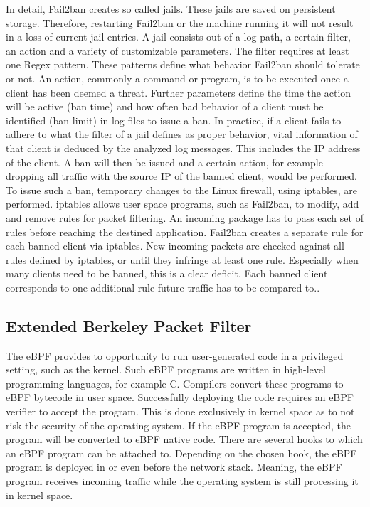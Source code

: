 In detail, Fail2ban creates so called jails.
These jails are saved on persistent storage.
Therefore, restarting Fail2ban or the machine running it will not result in a loss of current jail entries.
A jail consists out of a log path, a certain filter, an action and a variety of customizable parameters.
The filter requires at least one \ac{Regex} pattern.
These patterns define what behavior Fail2ban should tolerate or not.
An action, commonly a command or program, is to be executed once a client has been deemed a threat.
Further parameters define the time the action will be active (ban time) and how often bad behavior of a client must be identified (ban limit) in log files to issue a ban.
In practice, if a client fails to adhere to what the filter of a jail defines as proper behavior, vital information of that client is deduced by the analyzed log messages.
This includes the \ac{IP} address of the client.
A ban will then be issued and a certain action, for example dropping all traffic with the source \ac{IP} of the banned client, would be performed.
To issue such a ban, temporary changes to the Linux firewall, using iptables, are performed.
iptables allows user space programs, such as Fail2ban, to modify, add and remove rules for packet filtering.
An incoming package has to pass each set of rules before reaching the destined application.
Fail2ban creates a separate rule for each banned client via iptables.
New incoming packets are checked against all rules defined by iptables, or until they infringe at least one rule.
Especially when many clients need to be banned, this is a clear deficit.
Each banned client corresponds to one additional rule future traffic has to be compared to.\cite{mikolajczak:ebpf}.

\subsection{Extended Berkeley Packet Filter}
The \ac{eBPF} provides to opportunity to run user-generated code in a privileged setting, such as the kernel.
Such \ac{eBPF} programs are written in high-level programming languages, for example C.
Compilers convert these programs to \ac{eBPF} bytecode in user space.
Successfully deploying the code requires an \ac{eBPF} verifier to accept the program.
This is done exclusively in kernel space as to not risk the security of the operating system.
If the \ac{eBPF} program is accepted, the program will be converted to \ac{eBPF} native code.
There are several hooks to which an \ac{eBPF} program can be attached to.
Depending on the chosen hook, the \ac{eBPF} program is deployed in or even before the network stack.
Meaning, the \ac{eBPF} program receives incoming traffic while the operating system is still processing it in kernel space.\cite{mikolajczak:ebpf}

